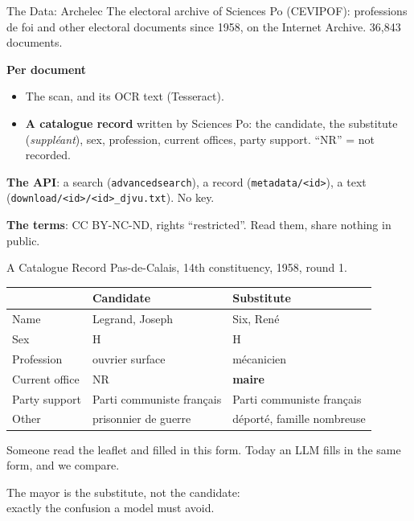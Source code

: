 \documentclass[svgnames,x11names,dvipsnames]{beamer}
\begin{document}
\begin{frame}{The Data: Archelec}
\small
The electoral archive of Sciences Po (CEVIPOF): professions de foi and other electoral documents since 1958, on the Internet Archive. 36,843 documents.

\vspace{0.3cm}
\textbf{Per document}
\begin{itemize}
    \setlength{\itemsep}{3pt}
    \item The scan, and its OCR text (Tesseract).
    \item \textbf{A catalogue record} written by Sciences Po: the candidate, the substitute (\textit{suppl\'eant}), sex, profession, current offices, party support. ``NR'' = not recorded.
\end{itemize}

\vspace{0.3cm}
\textbf{The API}: a search (\texttt{advancedsearch}), a record (\texttt{metadata/<id>}), a text (\texttt{download/<id>/<id>\_djvu.txt}). No key.

\vspace{0.3cm}
\textbf{The terms}: CC BY-NC-ND, rights ``restricted''. Read them, share nothing in public.
\end{frame}

\begin{frame}{A Catalogue Record}
\footnotesize
Pas-de-Calais, 14th constituency, 1958, round 1.

\vspace{0.2cm}
\renewcommand{\arraystretch}{1.3}
\begin{tabular}{@{}lll@{}}
\toprule
& \textbf{Candidate} & \textbf{Substitute} \\
\midrule
Name & Legrand, Joseph & Six, Ren\'e \\
Sex & H & H \\
Profession & ouvrier surface & m\'ecanicien \\
Current office & NR & \textbf{maire} \\
Party support & Parti communiste fran\c{c}ais & Parti communiste fran\c{c}ais \\
Other & prisonnier de guerre & d\'eport\'e, famille nombreuse \\
\bottomrule
\end{tabular}

\vspace{0.4cm}
\small
Someone read the leaflet and filled in this form. Today an LLM fills in the same form, and we compare.

\vspace{0.3cm}
\centering
\alert{The mayor is the substitute, not the candidate:\\ exactly the confusion a model must avoid.}
\end{frame}
\end{document}
